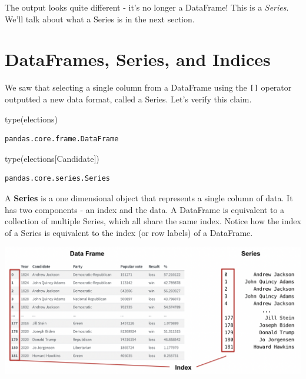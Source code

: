 \documentclass[
  letterpaper,
  DIV=11,
  numbers=noendperiod]{scrreprt}
\newenvironment{Shaded}{\begin{snugshade}}{\end{snugshade}}
\newcommand{\BuiltInTok}[1]{\textcolor[rgb]{0.00,0.23,0.31}{#1}}
\newcommand{\NormalTok}[1]{\textcolor[rgb]{0.00,0.23,0.31}{#1}}
\newcommand{\StringTok}[1]{\textcolor[rgb]{0.13,0.47,0.30}{#1}}
\begin{document}
The output looks quite different - it's no longer a DataFrame! This is a
\emph{Series}. We'll talk about what a Series is in the next section.

\hypertarget{dataframes-series-and-indices}{%
\section{DataFrames, Series, and
Indices}\label{dataframes-series-and-indices}}

We saw that selecting a single column from a DataFrame using the
\texttt{{[}{]}} operator outputted a new data format, called a Series.
Let's verify this claim.

\begin{Shaded}
\begin{Highlighting}[]
\BuiltInTok{type}\NormalTok{(elections)}
\end{Highlighting}
\end{Shaded}

\begin{verbatim}
pandas.core.frame.DataFrame
\end{verbatim}

\begin{Shaded}
\begin{Highlighting}[]
\BuiltInTok{type}\NormalTok{(elections[}\StringTok{\textquotesingle{}Candidate\textquotesingle{}}\NormalTok{])}
\end{Highlighting}
\end{Shaded}

\begin{verbatim}
pandas.core.series.Series
\end{verbatim}

A \textbf{Series} is a one dimensional object that represents a single
column of data. It has two components - an index and the data. A
DataFrame is equivalent to a collection of multiple Series, which all
share the same index. Notice how the index of a Series is equivalent to
the index (or row labels) of a DataFrame.

\includegraphics{pandas_1/images/index_comparison_1.png}
\end{document}
